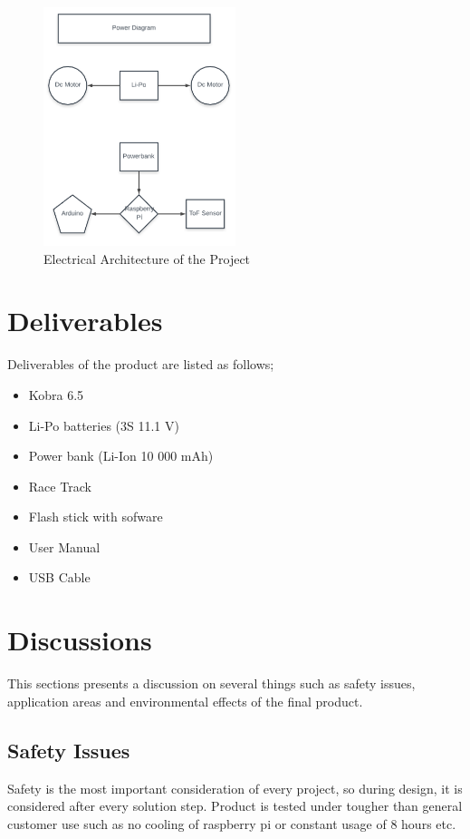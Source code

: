 \documentclass[a4paper,12pt]{article}
\begin{document}
	\begin{figure}[H]
		\includegraphics[width=0.5\textwidth,center]{images/elec_arch}
		\caption{Electrical Architecture of the Project}\label{fig:elec}
	\end{figure}



	\section{Deliverables}
		Deliverables of the product are listed as follows;
		\begin{itemize}
			\item Kobra 6.5  
			\item Li-Po batteries (3S 11.1 V)
			\item Power bank (Li-Ion 10 000 mAh)
			\item Race Track 
			\item Flash stick with sofware 
			\item User Manual 
			\item USB Cable
		\end{itemize} 
	\section{Discussions}
		This sections presents a discussion on several things such as safety issues, application areas and environmental effects of the final product.
	
	\subsection{Safety Issues}
		Safety is the most important consideration of every project, so during design, it is considered after every solution step. Product is tested under tougher than general customer use such as no cooling of raspberry pi or constant usage of 8 hours etc. 
		
\end{document}
